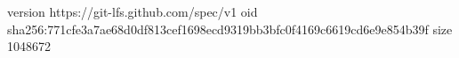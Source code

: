 version https://git-lfs.github.com/spec/v1
oid sha256:771cfe3a7ae68d0df813cef1698ecd9319bb3bfc0f4169c6619cd6e9e854b39f
size 1048672
